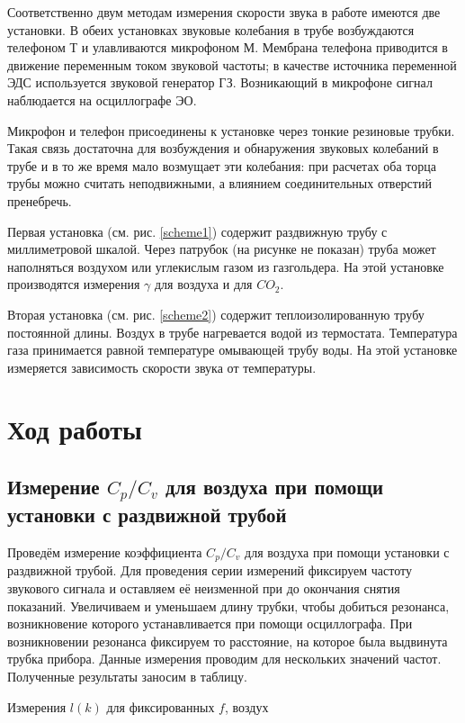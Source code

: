 \documentclass[12pt,a4paper]{article}
\newcommand{\figref}[1]{(см. рис. \ref{#1})}
\begin{document}
	Соответственно двум методам измерения скорости звука в работе имеются две установки.
	В обеих установках звуковые колебания в трубе возбуждаются телефоном Т и улавливаются микрофоном М.
	Мембрана телефона приводится в движение переменным током звуковой частоты; в качестве источника переменной ЭДС используется звуковой генератор ГЗ.
	Возникающий в микрофоне сигнал наблюдается на осциллографе ЭО.
	
	Микрофон и телефон присоединены к установке через тонкие резиновые трубки.
	Такая связь достаточна для возбуждения и обнаружения звуковых колебаний в трубе и в то же время мало возмущает эти колебания: при расчетах оба торца трубы можно считать неподвижными, а влиянием соединительных отверстий пренебречь.
	
	Первая установка \figref{scheme1} содержит раздвижную трубу с миллиметровой шкалой.
	Через патрубок (на рисунке не показан) труба может наполняться воздухом или углекислым газом из газгольдера.
	На этой установке производятся измерения $\gamma$ для воздуха и для $CO_2$.
	
	Вторая установка \figref{scheme2} содержит теплоизолированную трубу постоянной длины.
	Воздух в трубе нагревается водой из термостата.
	Температура газа принимается равной температуре омывающей трубу воды.
	На этой установке измеряется зависимость скорости звука от температуры.
	
	\section*{Ход работы}
	
		\subsection*{Измерение $ C_p/C_v $ для воздуха при помощи установки с раздвижной трубой}
		
		Проведём измерение коэффициента $ C_p/C_v $ для воздуха при помощи установки с раздвижной трубой.
		Для проведения серии измерений фиксируем частоту звукового сигнала и оставляем её неизменной при до окончания снятия показаний.
		Увеличиваем и уменьшаем длину трубки, чтобы добиться резонанса, возникновение которого устанавливается при помощи осциллографа.
		При возникновении резонанса фиксируем то расстояние, на которое была выдвинута трубка прибора.
		Данные измерения проводим для нескольких значений частот.
		Полученные результаты заносим в таблицу.
		
		\begin{table}[H]
			\caption{Измерения $l(k)$ для фиксированных $f$, воздух}
			
		\end{table}
		
\end{document}
